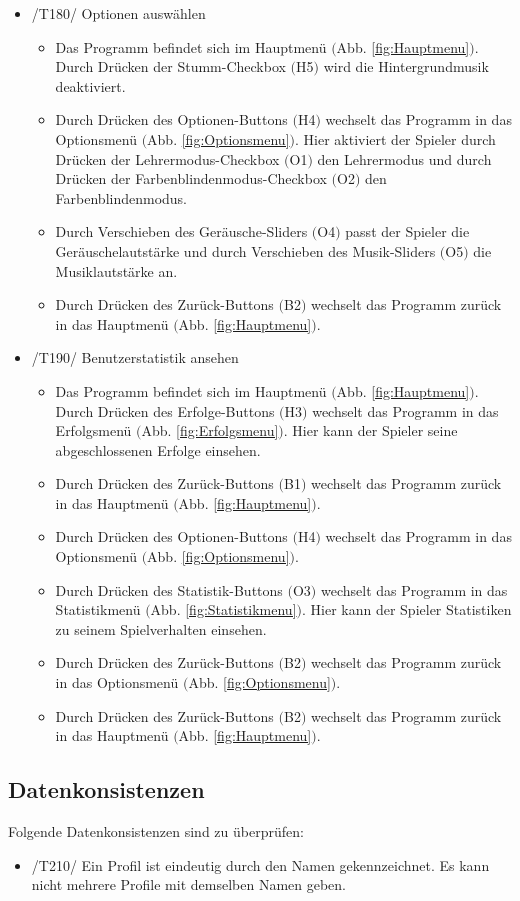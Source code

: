 \begin{itemize}
\item /T180/ Optionen auswählen
\begin{itemize}
\item Das Programm befindet sich im Hauptmenü $($Abb. \ref{fig:Hauptmenu}$)$. Durch Drücken der Stumm-Checkbox $($H5$)$ wird die Hintergrundmusik deaktiviert.
\item Durch Drücken des Optionen-Buttons $($H4$)$ wechselt das Programm in das Optionsmenü $($Abb. \ref{fig:Optionsmenu}$)$. Hier aktiviert der Spieler durch Drücken der Lehrermodus-Checkbox $($O1$)$ den Lehrermodus und durch Drücken der Farbenblindenmodus-Checkbox $($O2$)$ den Farbenblindenmodus.
\item Durch Verschieben des Geräusche-Sliders $($O4$)$ passt der Spieler die Geräuschelautstärke und durch Verschieben des Musik-Sliders $($O5$)$ die Musiklautstärke an.
\item Durch Drücken des Zurück-Buttons $($B2$)$ wechselt das Programm zurück in das Hauptmenü $($Abb. \ref{fig:Hauptmenu}$)$.
\end{itemize}

\item /T190/ Benutzerstatistik ansehen
\begin{itemize}
\item Das Programm befindet sich im Hauptmenü $($Abb. \ref{fig:Hauptmenu}$)$. Durch Drücken des Erfolge-Buttons $($H3$)$ wechselt das Programm in das Erfolgsmenü $($Abb. \ref{fig:Erfolgsmenu}$)$. Hier kann der Spieler seine abgeschlossenen Erfolge einsehen.
\item Durch Drücken des Zurück-Buttons $($B1$)$ wechselt das Programm zurück in das Hauptmenü $($Abb. \ref{fig:Hauptmenu}$)$.
\item Durch Drücken des Optionen-Buttons $($H4$)$ wechselt das Programm in das Optionsmenü $($Abb. \ref{fig:Optionsmenu}$)$.
\item Durch Drücken des Statistik-Buttons $($O3$)$ wechselt das Programm in das Statistikmenü $($Abb. \ref{fig:Statistikmenu}$)$. Hier kann der Spieler Statistiken zu seinem Spielverhalten einsehen.
\item Durch Drücken des Zurück-Buttons $($B2$)$ wechselt das Programm zurück in das Optionsmenü $($Abb. \ref{fig:Optionsmenu}$)$.
\item Durch Drücken des Zurück-Buttons $($B2$)$ wechselt das Programm zurück in das Hauptmenü $($Abb. \ref{fig:Hauptmenu}$)$.
\end{itemize}

\end{itemize}

\subsection{Datenkonsistenzen}
Folgende Datenkonsistenzen sind zu überprüfen:

\begin{itemize}
\item /T210/ Ein Profil ist eindeutig durch den Namen gekennzeichnet. Es kann nicht mehrere Profile mit demselben Namen geben.
\end{itemize}
